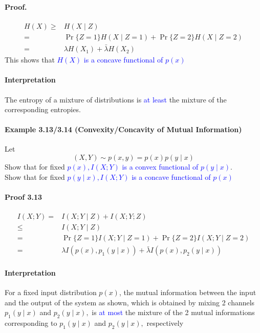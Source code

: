\documentclass[8pt]{article}
\begin{document}
\paragraph{Proof.}
$$
\begin{aligned}
H(X) \geq & H(X \mid Z) \\
= & \operatorname{Pr}\{Z=1\} H(X \mid Z=1)+\operatorname{Pr}\{Z=2\} H(X \mid Z=2) \\
= & \lambda H\left(X_{1}\right)+\bar{\lambda} H\left(X_{2}\right)
\end{aligned}
$$
This shows that \textcolor{blue}{$H(X)$ is a concave functional of $p(x)$}

\paragraph{Interpretation} The entropy of a mixture of distributions is \textcolor{blue}{at least} the mixture of the corresponding entropies.

\begin{tcolorbox}
\paragraph{Example 3.13/3.14 (Convexity/Concavity of Mutual Information)} Let
$$
(X, Y) \sim p(x, y)=p(x) p(y \mid x)
$$
Show that for fixed \textcolor{blue}{$p(x), I(X ; Y)$ is a convex functional of $p(y \mid x)$}.\\
Show that for fixed \textcolor{blue}{$p(y \mid x), I(X ; Y)$ is a concave functional of $p(x)$}
\end{tcolorbox}
\paragraph{Proof 3.13}
$$
\begin{aligned}
I(X ; Y) =& I(X ; Y \mid Z)+I(X ; Y ; Z) \\
\leq & I(X ; Y \mid Z) \\
=& \operatorname{Pr}\{Z=1\} I(X ; Y \mid Z=1) +\operatorname{Pr}\{Z=2\} I(X ; Y \mid Z=2) \\
=& \lambda I\left(p(x), p_{1}(y \mid x)\right)+\bar{\lambda} I\left(p(x), p_{2}(y \mid x)\right)
\end{aligned}
$$
\paragraph{Interpretation} For a fixed input distribution $p(x)$, the mutual information between the input and the output of the system as shown, which is obtained by mixing 2 channels $p_{1}(y \mid x)$ and $p_{2}(y \mid x),$ is \textcolor{blue}{at most} the mixture of the 2 mutual informations corresponding to $p_{1}(y \mid x)$ and $p_{2}(y \mid x),$ respectively
\end{document}
